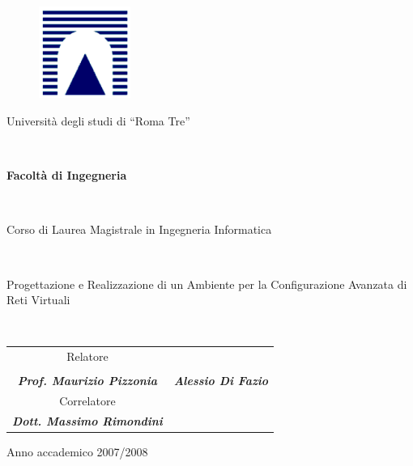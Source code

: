 \begin{figure}[!h]
	\centering
	\includegraphics[width=3cm]{images/logo_uni.png}
\end{figure}
\begin{center}
	\begin{Large}Università degli studi di ``Roma Tre''\end{Large}\\
	\vspace{0.5cm}
	\begin{Large}\textbf{Facoltà di Ingegneria}\end{Large}\\
	\vspace{0.5cm}
	\begin{Large}Corso di Laurea Magistrale in Ingegneria Informatica\end{Large}\\
	\vspace{2cm}
	\begin{huge}Progettazione e Realizzazione di un Ambiente per la Configurazione Avanzata di Reti Virtuali\end{huge}\\
	
	\vspace{3cm}	
	\begin{tabular}{cc}
		\begin{minipage}{6.5cm}
			\centering
			Relatore
		\end{minipage}
		&
		\begin{minipage}{6.5cm}
			\centering
			Laureando\\
		\end{minipage}
		\\
		\begin{minipage}{6.5cm}
			\centering
			\vspace{0.4cm}
			\textbf{\textit{Prof. Maurizio Pizzonia}}
		\end{minipage}
		&
		\begin{minipage}{6.5cm}
			\centering
			\textbf{\textit{Alessio Di Fazio}}
		\end{minipage}
		\\
		\begin{minipage}{6.5cm}
			\centering
			\vspace{1cm}
			Correlatore
		\end{minipage}
		\\
		\begin{minipage}{6.5cm}
			\centering
			\vspace{0.4cm}
			\textbf{\textit{Dott. Massimo Rimondini}}
		\end{minipage}
	\end{tabular}

	\vspace{2cm}%
	\begin{minipage}{8cm}
		\centering
		Anno accademico 2007/2008
	\end{minipage}
\end{center}


